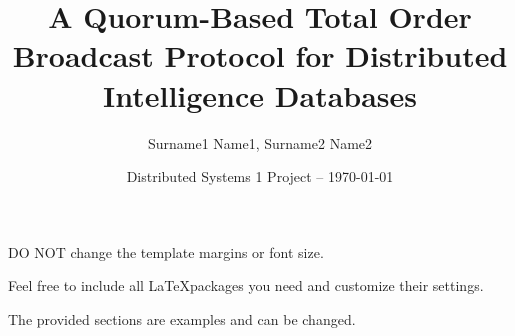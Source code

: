 \documentclass[a4paper]{article}
\title{\vspace{-20mm}A Quorum-Based Total Order Broadcast Protocol for Distributed Intelligence Databases}
\author{Surname1 Name1, Surname2 Name2}
\date{Distributed Systems 1 Project -- \today}
\begin{document}
    \maketitle
    
    
    

    \begin{center}
        \Large\color{red}
        DO NOT change the template margins or font size.

        Feel free to include all \LaTeX packages you need and customize their settings.

        The provided sections are examples and can be changed.
    \end{center}
\end{document}

